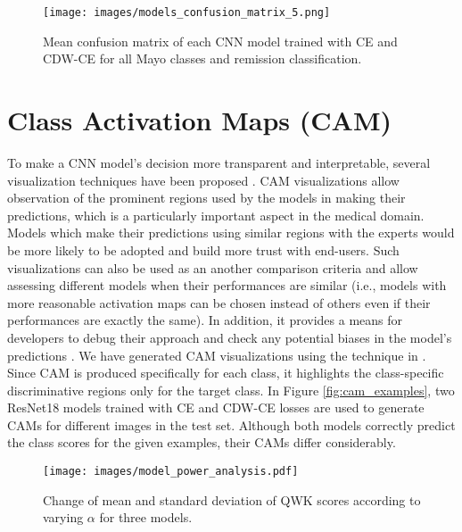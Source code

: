 \documentclass[runningheads]{llncs}
\begin{document}
\begin{figure}[t!]
  \centering
  \texttt{[image: images/models\_confusion\_matrix\_5.png]}
  \caption{Mean confusion matrix of each CNN model trained with CE and CDW-CE for all Mayo classes and remission classification.}
  \label{fig:models_confusion_matrix}
\end{figure}


\section{Class Activation Maps (CAM)}

To make a CNN model's decision more transparent and interpretable, several visualization techniques have been proposed \cite{zhou2016learning,selvaraju2017grad}. CAM visualizations allow observation of the prominent regions used by the models in making their predictions, which is a particularly important aspect in the medical domain. Models which make their predictions using similar regions with the experts would be more likely to be adopted and build more trust with end-users. Such visualizations can also be used as an another comparison criteria and allow assessing different models when their performances are similar (i.e., models with more reasonable activation maps can be chosen instead of others even if their performances are exactly the same).  In addition, it provides a means for developers to debug their approach and check any potential biases in the model's predictions \cite{selvaraju2017grad}. We have generated CAM visualizations using the technique in \cite{zhou2016learning}. Since CAM is produced specifically for each class, it highlights the class-specific discriminative regions only for the target class. In Figure \ref{fig:cam_examples}, two ResNet18 models trained with CE and CDW-CE losses are used to generate CAMs for different images in the test set. Although both models correctly predict the class scores for the given examples, their CAMs differ considerably.   

\begin{figure}[t!]
  \centering
  \texttt{[image: images/model\_power\_analysis.pdf]}
  \caption{Change of mean and standard deviation of QWK scores according to varying $\alpha$ for three models.}
  \label{fig:power_analysis}
\end{figure}
\end{document}

